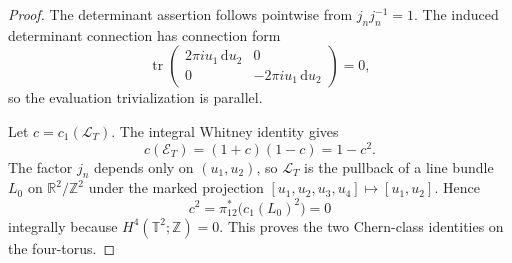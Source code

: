 \begin{proof}
The determinant assertion follows pointwise from
\(j_nj_n^{-1}=1\).  The induced determinant connection has connection
form
\[
 \operatorname{tr}
 \begin{pmatrix}
  2\pi i u_1\,\mathrm du_2&0\\0&-2\pi i u_1\,\mathrm du_2
 \end{pmatrix}=0,
\]
so the evaluation trivialization is parallel.

Let \(c=c_1(\mathscr L_T)\).  The integral Whitney identity gives
\[
 c(\mathscr E_T)=(1+c)(1-c)=1-c^2.
\]
The factor \(j_n\) depends only on \((u_1,u_2)\), so \(\mathscr L_T\) is the
pullback of a line bundle \(L_0\) on
\(\mathbb R^2/\mathbb Z^2\) under the marked projection
\([u_1,u_2,u_3,u_4]\mapsto[u_1,u_2]\).  Hence
\[
 c^2=\pi_{12}^*\bigl(c_1(L_0)^2\bigr)=0
\]
integrally because \(H^4(\mathbb T^2;\mathbb Z)=0\).  This proves the two
Chern-class identities on the four-torus.


\end{proof}
